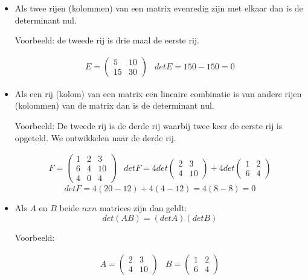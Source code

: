 \begin{itemize}
	\item Als twee rijen (kolommen) van een matrix evenredig zijn met elkaar dan is de determinant nul. 
	
	Voorbeeld: de tweede rij is drie maal de eerste rij.
	
	\[ \begin{array}{ll} E=\left( \begin{matrix}
	5 & 10 \\ 15 & 30 
	\end{matrix} \right) & det E=150-150=0 \end{array} \]
	
	\item Als een rij (kolom) van een matrix een lineaire combinatie is van andere rijen (kolommen) van de matrix dan is de determinant nul.
	
	Voorbeeld: De tweede rij is de derde rij waarbij twee keer de eerste rij is opgeteld. We ontwikkelen naar de derde rij. 
	
	\[ \begin{array}{ll} F=\left( \begin{matrix}
	1 & 2 & 3 \\ 6 & 4 & 10 \\ 4 & 0 & 4 
	\end{matrix} \right) & det F = 4 det \left( \begin{matrix} 2 & 3 \\ 4 & 10 \end{matrix} \right) + 4 det \left( \begin{matrix} 1 & 2 \\ 6 & 4 \end{matrix} \right) \end{array} \]
	\[ det F =4(20-12)+4(4-12)=4(8-8)=0 \]
	
	\item Als $A$ en $B$ beide $nxn$ matrices zijn dan geldt:
	\[ det(AB)=(det A) (det B) \]
	
	Voorbeeld:
	
	\[ \begin{array}{ll} A=\left( \begin{matrix}
	2 & 3 \\ 4 & 10
	\end{matrix} \right) & B=\left( \begin{matrix}
	1 & 2 \\ 6 & 4
	\end{matrix} \right) \end{array} \]
	

\end{itemize}
